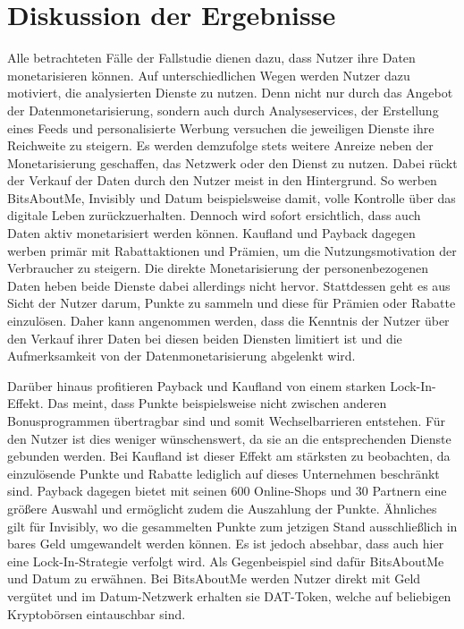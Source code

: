 \section{Diskussion der Ergebnisse}
Alle betrachteten Fälle der Fallstudie dienen dazu, dass Nutzer ihre Daten monetarisieren können. Auf unterschiedlichen Wegen werden Nutzer dazu motiviert, die analysierten Dienste zu nutzen. Denn nicht nur durch das Angebot der Datenmonetarisierung, sondern auch durch Analyseservices, der Erstellung eines Feeds und personalisierte Werbung versuchen die jeweiligen Dienste ihre Reichweite zu steigern. Es werden demzufolge stets weitere Anreize neben der Monetarisierung geschaffen, das Netzwerk oder den Dienst zu nutzen. Dabei rückt der Verkauf der Daten durch den Nutzer meist in den Hintergrund. So werben BitsAboutMe, Invisibly und Datum beispielsweise damit, volle Kontrolle über das digitale Leben zurückzuerhalten. Dennoch wird sofort ersichtlich, dass auch Daten aktiv monetarisiert werden können. Kaufland und Payback dagegen werben primär mit Rabattaktionen und Prämien, um die Nutzungsmotivation der Verbraucher zu steigern. Die direkte Monetarisierung der personenbezogenen Daten heben beide Dienste dabei allerdings nicht hervor. Stattdessen geht es aus Sicht der Nutzer darum, Punkte zu sammeln und diese für Prämien oder Rabatte einzulösen. Daher kann angenommen werden, dass die Kenntnis der Nutzer über den Verkauf ihrer Daten bei diesen beiden Diensten limitiert ist und die Aufmerksamkeit von der Datenmonetarisierung abgelenkt wird. \newline

\noindent Darüber hinaus profitieren Payback und Kaufland von einem starken Lock-In-Effekt. Das meint, dass Punkte beispielsweise nicht zwischen anderen Bonusprogrammen übertragbar sind und somit Wechselbarrieren entstehen. Für den Nutzer ist dies weniger wünschenswert, da sie an die entsprechenden Dienste gebunden werden. Bei Kaufland ist dieser Effekt am stärksten zu beobachten, da einzulösende Punkte und Rabatte lediglich auf dieses Unternehmen beschränkt sind. Payback dagegen bietet mit seinen 600 Online-Shops und 30 Partnern eine größere Auswahl und ermöglicht zudem die Auszahlung der Punkte. Ähnliches gilt für Invisibly, wo die gesammelten Punkte zum jetzigen Stand ausschließlich in bares Geld umgewandelt werden können. Es ist jedoch absehbar, dass auch hier eine Lock-In-Strategie verfolgt wird. Als Gegenbeispiel sind dafür BitsAboutMe und Datum zu erwähnen. Bei BitsAboutMe werden Nutzer direkt mit Geld vergütet und im Datum-Netzwerk erhalten sie DAT-Token, welche auf beliebigen Kryptobörsen eintauschbar sind. \newline 

